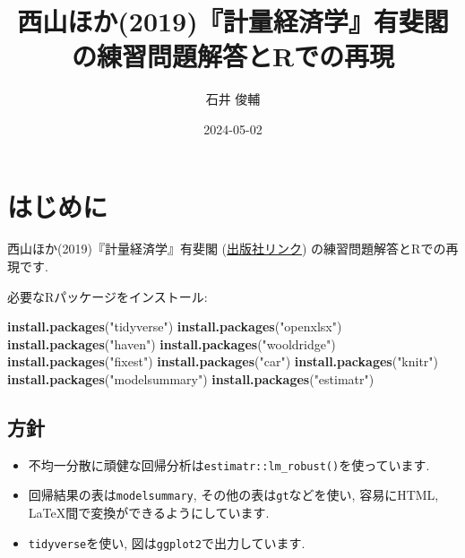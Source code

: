 \documentclass[
]{book}
\title{西山ほか(2019)『計量経済学』有斐閣の練習問題解答とRでの再現}
\author{石井 俊輔}
\date{2024-05-02}
\newenvironment{Shaded}{\begin{snugshade}}{\end{snugshade}}
\newcommand{\FunctionTok}[1]{\textcolor[rgb]{0.13,0.29,0.53}{\textbf{#1}}}
\newcommand{\NormalTok}[1]{#1}
\newcommand{\StringTok}[1]{\textcolor[rgb]{0.31,0.60,0.02}{#1}}
\providecommand{\tightlist}{%
  \setlength{\itemsep}{0pt}\setlength{\parskip}{0pt}}
\begin{document}
\maketitle

{
\setcounter{tocdepth}{1}
\tableofcontents
}
\hypertarget{ux306fux3058ux3081ux306b}{%
\chapter*{はじめに}\label{ux306fux3058ux3081ux306b}}

西山ほか(2019)『計量経済学』有斐閣 (\href{https://www.yuhikaku.co.jp/books/detail/9784641053854}{出版社リンク}) の練習問題解答とRでの再現です.

必要なRパッケージをインストール:

\begin{Shaded}
\begin{Highlighting}[]
\FunctionTok{install.packages}\NormalTok{(}\StringTok{"tidyverse"}\NormalTok{)}
\FunctionTok{install.packages}\NormalTok{(}\StringTok{"openxlsx"}\NormalTok{)}
\FunctionTok{install.packages}\NormalTok{(}\StringTok{"haven"}\NormalTok{)}
\FunctionTok{install.packages}\NormalTok{(}\StringTok{"wooldridge"}\NormalTok{)}
\FunctionTok{install.packages}\NormalTok{(}\StringTok{"fixest"}\NormalTok{)}
\FunctionTok{install.packages}\NormalTok{(}\StringTok{"car"}\NormalTok{)}
\FunctionTok{install.packages}\NormalTok{(}\StringTok{"knitr"}\NormalTok{)}
\FunctionTok{install.packages}\NormalTok{(}\StringTok{"modelsummary"}\NormalTok{)}
\FunctionTok{install.packages}\NormalTok{(}\StringTok{"estimatr"}\NormalTok{)}
\end{Highlighting}
\end{Shaded}

\hypertarget{ux65b9ux91dd}{%
\section*{方針}\label{ux65b9ux91dd}}

\begin{itemize}
\tightlist
\item
  不均一分散に頑健な回帰分析は\texttt{estimatr::lm\_robust()}を使っています.
\item
  回帰結果の表は\texttt{modelsummary}, その他の表は\texttt{gt}などを使い, 容易にHTML, LaTeX間で変換ができるようにしています.
\item
  \texttt{tidyverse}を使い, 図は\texttt{ggplot2}で出力しています.
\end{itemize}
\end{document}
